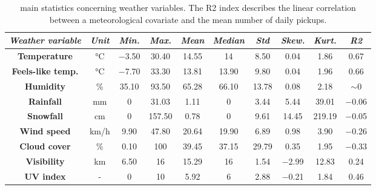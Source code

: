 \begin{table}
	\centering
	\renewcommand\arraystretch{1.3}
	\begin{tabular}{c|c|c|c|c|c|c|c|c|c}
		\hline
		\textit{Weather variable} & \textit{Unit} & \textit{Min.} & \textit{Max.} & \textit{Mean} & \textit{Median} & \textit{Std} & \textit{Skew.}  & \textit{Kurt.} & \textit{R2} \\
		\hline
		\textbf{Temperature} & \unit{\degreeCelsius} & \num{-3.50} & \num{30.40} & \num{14.55} & \num{14} & \num{8.50} & \num{0.04} & \num{1.86} & \num{0.67} \\
		\hline
		\textbf{Feels-like temp.} & \unit{\degreeCelsius} & \num{-7.70} & \num{33.30} & \num{13.81} & \num{13.90} & \num{9.80} & \num{0.04} & \num{1.96} & \num{0.66} \\
		\hline
		\textbf{Humidity} & \si{\percent} & \num{35.10} & \num{93.50} & \num{65.28} & \num{66.10} & \num{13.78} & \num{0.08} & \num{2.18} & $\sim 0$ \\
		\hline
		\textbf{Rainfall} & \si{\milli\meter} & \num{0} & \num{31.03} & \num{1.11} & \num{0} & \num{3.44} & \num{5.44} & \num{39.01} & \num{-0.06} \\
		\hline
		\textbf{Snowfall} & \si{\centi\meter} & \num{0} & \num{157.50} & \num{0.78} & \num{0} & \num{9.61} & \num{14.45} & \num{219.19} & \num{-0.05} \\
		\hline
		\textbf{Wind speed} & \si{\kilo\meter/\hour} & \num{9.90} & \num{47.80} & \num{20.64} & \num{19.90} & \num{6.89} & \num{0.98} & \num{3.90} & \num{-0.26} \\
		\hline
		\textbf{Cloud cover} & \si{\percent} & \num{0.10} & \num{100} & \num{39.45} & \num{37.15} & \num{29.79} & \num{0.35} &\num{ 1.95} & \num{-0.33} \\
		\hline
		\textbf{Visibility} & \si{\kilo\meter} & \num{6.50} & \num{16} & \num{15.29} & \num{16} & \num{1.54} & \num{-2.99} & \num{12.83} & \num{0.24} \\
		\hline
		\textbf{UV index} & - & \num{ 0} & \num{10} & \num{5.92} & \num{6} & \num{2.88} & \num{-0.21} & \num{1.84} & \num{0.46} \\
		\hline
	\end{tabular}
	\caption[Main statistics concerning weather variables]{main statistics concerning weather variables. The R2 index describes the linear correlation between a meteorological covariate and the mean number of daily pickups.}
	\label{Weather_stats}
\end{table}

